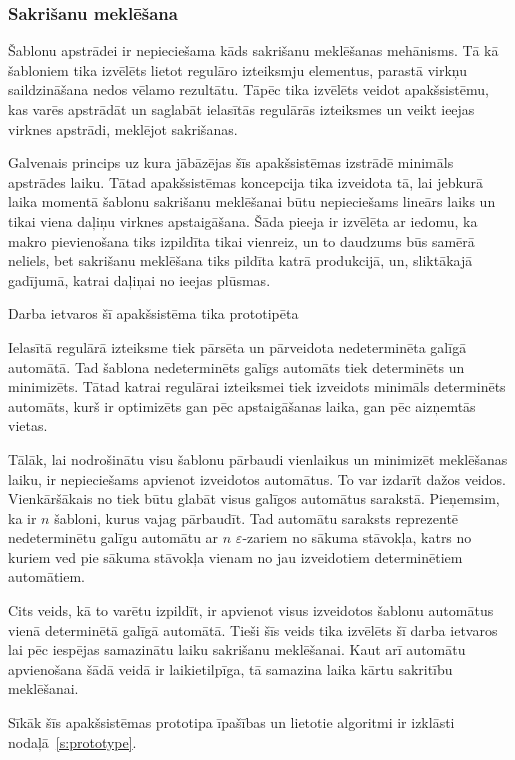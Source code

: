 \subsubsection{\label{sbsbs:sys_matches}Sakrišanu meklēšana}

Šablonu apstrādei ir nepieciešama kāds sakrišanu meklēšanas mehānisms. Tā kā šabloniem tika izvēlēts lietot regulāro izteiksmju elementus, parastā virkņu saildzināšana nedos vēlamo rezultātu. Tāpēc tika izvēlēts veidot apakšsistēmu, kas varēs apstrādāt un saglabāt ielasītās regulārās izteiksmes un veikt ieejas virknes apstrādi, meklējot sakrišanas.

Galvenais princips uz kura jābāzējas šīs apakšsistēmas izstrādē minimāls apstrādes laiku. Tātad apakšsistēmas koncepcija  tika izveidota tā, lai jebkurā laika momentā šablonu sakrišanu meklēšanai būtu nepieciešams lineārs laiks un tikai viena daļiņu virknes apstaigāšana. Šāda pieeja ir izvēlēta ar iedomu, ka makro pievienošana tiks izpildīta tikai vienreiz, un to daudzums būs samērā neliels, bet sakrišanu meklēšana tiks pildīta katrā produkcijā, un, sliktākajā gadījumā, katrai daļiņai no ieejas plūsmas.

Darba ietvaros šī apakšsistēma tika prototipēta

Ielasītā regulārā izteiksme tiek pārsēta un pārveidota nedeterminēta galīgā automātā. Tad šablona nedeterminēts galīgs automāts tiek determinēts un minimizēts. Tātad katrai regulārai izteiksmei tiek izveidots minimāls determinēts automāts, kurš ir optimizēts gan pēc apstaigāšanas laika, gan pēc aizņemtās vietas.

Tālāk, lai nodrošinātu visu šablonu pārbaudi vienlaikus un minimizēt meklēšanas laiku, ir nepieciešams apvienot izveidotos automātus. To var izdarīt dažos veidos. Vienkāršākais no tiek būtu glabāt visus galīgos automātus sarakstā. Pieņemsim, ka ir $n$ šabloni, kurus vajag pārbaudīt. Tad automātu saraksts reprezentē nedeterminētu galīgu automātu ar $n$ $\varepsilon$-zariem no sākuma stāvokļa, katrs no kuriem ved pie sākuma stāvokļa vienam no jau izveidotiem determinētiem automātiem.

Cits veids, kā to varētu izpildīt, ir apvienot visus izveidotos šablonu automātus vienā determinētā galīgā automātā. Tieši šīs veids tika izvēlēts šī darba ietvaros lai pēc iespējas samazinātu laiku sakrišanu meklēšanai. Kaut arī automātu apvienošana šādā veidā ir laikietilpīga, tā samazina laika kārtu sakritību meklēšanai.

Sīkāk šīs apakšsistēmas prototipa īpašības un lietotie algoritmi ir izklāsti nodaļā~\ref{s:prototype}.

